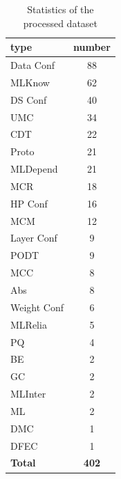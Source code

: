 \begin{table}[ht]
\centering
\caption{Statistics of the processed dataset}
\label{tab:stats}
\begin{tabular}{lc}
\hline
\textbf{type} & \textbf{number} \\
\hline
Data Conf & 88 \\
MLKnow & 62 \\
DS Conf & 40 \\
UMC & 34 \\
CDT & 22 \\
Proto & 21 \\
MLDepend & 21 \\
MCR & 18 \\
HP Conf & 16 \\
MCM & 12 \\
Layer Conf & 9 \\
PODT & 9 \\
MCC & 8 \\
Abs & 8 \\
Weight Conf & 6 \\
MLRelia & 5 \\
PQ & 4 \\
BE & 2 \\
GC & 2 \\
MLInter & 2 \\
ML & 2 \\
DMC & 1 \\
DFEC & 1 \\
\textbf{Total} & \textbf{402} \\
\hline
\end{tabular}
\end{table}